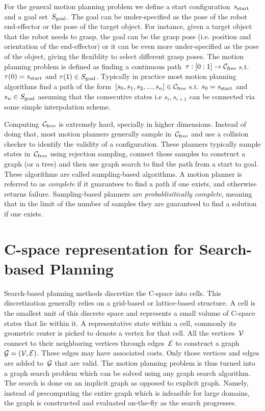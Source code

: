 \documentclass[a4paper]{report}
\begin{document}
For the general motion planning problem we define a start configuration~$s_{\textrm{start}}$ and a goal set~$S_{\rm goal}$. The goal can be under-specified as the pose of the robot end-effector or the pose of the target object. For instance, given a target object that the robot needs to grasp, the goal can be the grasp pose (i.e. position and orientation of the end-effector) or it can be even more under-specified as the pose of the object, giving the flexiblity to select different grasp poses. The motion planning problem is defined as finding a continuous path~$\tau : [0:1] \rightarrow \mathcal{C}_{\rm free}$ s.t. $\tau(0) = s_{\textrm{start}}$ and $\tau(1) \in S_{\rm goal} $. Typically in practice most motion planning algorithms find a path of the form~$[s_0, s_1, s_2,...,s_n] \in \mathcal{C}_{\rm free}$ s.t. $s_0 = s_{\textrm{start}}$ and $s_n \in S_{\rm goal}$ assuming that the consecutive states i.e $s_i, s_{i+1}$ can be connected via some simple interpolation scheme.

Computing~$\mathcal{C}_{\rm free}$ is extremely hard, specially in higher dimensions. Instead of doing that, most motion planners generally sample in~$\mathcal{C}_{\rm free}$ and use a collision checker to identify the validity of a configuration. These planners typically sample states in~$\mathcal{C}_{\rm free}$ using rejection sampling, connect those samples to construct a graph (or a tree) and then use graph search to find the path from a start to goal. These algorithms are called sampling-based algorithms. A motion planner is referred to as \emph{complete} if it guarantees to find a path if one exists, and otherwise returns failure. Sampling-based planners are \emph{probablisitically complete}, meaning that in the limit of the number of samples they are guaranteed to find a solution if one exists.

\section{C-space representation for Search-based Planning}
\label{sec:sbp}
Search-based planning methods discretize the C-space into cells. This discretization generally relies on a grid-based or lattice-based structure. A cell is the smallest unit of this discrete space and represents a small volume of C-space states that lie within it. A representative state within a cell, commonly its geometric center is picked to denote a vertex for that cell. All the vertices~$\mathcal{V}$ connect to their neighboring vertices through edges~$\mathcal{E}$ to construct a graph~$\mathcal{G} = (\mathcal{V}, \mathcal{E})$. These edges may have associated costs. Only those vertices and edges are added to~$\mathcal{G}$ that are valid. The motion planning problem is thus turned into a graph search problem which can be solved using any graph search algorithm. The search is done on an implicit graph as opposed to explicit graph. Namely, instead of precomputing the entire graph which is infeasible for large domains, the graph is constructed and evaluated on-the-fly as the search progresses.
\end{document}

